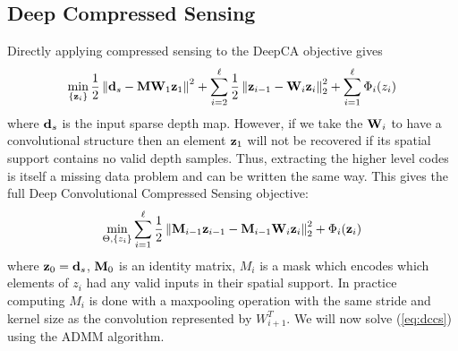 \subsection{Deep Compressed Sensing}
\label{sec:deep-compr-sens}

Directly applying compressed sensing to the DeepCA objective gives
\begin{equation}
  \min_{\{\mathbf{z}_i\}} \frac{1}{2} \left\Vert \mathbf{d}_s - \mathbf{M}\mathbf{W}_1\mathbf{z}_1 \right\Vert^2  +  \sum_{i=2}^{\ell} \frac{1}{2} \left\Vert \mathbf{z}_{i-1} - \mathbf{W}_i\mathbf{z}_i\right\Vert_2^2 + \sum_{i=1}^{\ell}\Phi_i(z_i)  
\end{equation}
where $\mathbf{d}_s$ is the input sparse depth map. However, if we take the $\mathbf{W}_i$ to have a convolutional structure then an element $\mathbf{z}_1$ will not be recovered if its spatial support contains no valid depth samples. Thus, extracting the higher level codes is itself a missing data problem and can be written the same way. This gives the full Deep Convolutional Compressed Sensing objective:
\begin{equation}
  \label{eq:dccs}
  \min_{\Theta, \{z_i\}} \sum_{i=1}^{\ell} \frac{1}{2} \left\Vert \mathbf{M}_{i-1}\mathbf{z}_{i-1} - \mathbf{M}_{i-1}\mathbf{W}_i\mathbf{z}_i\right\Vert_2^2 + \Phi_i(\mathbf{z}_i)
\end{equation}
where $\mathbf{z}_0 = \mathbf{d}_s$, $\mathbf{M}_0$ is an identity matrix, $M_i$ is a mask which encodes which elements of $z_i$ had any valid inputs in their spatial support. In practice computing $M_i$ is done with a maxpooling operation with the same stride and kernel size as the convolution represented by $W_{i+1}^T$. We will now solve (\ref{eq:dccs}) using the ADMM algorithm.\\

